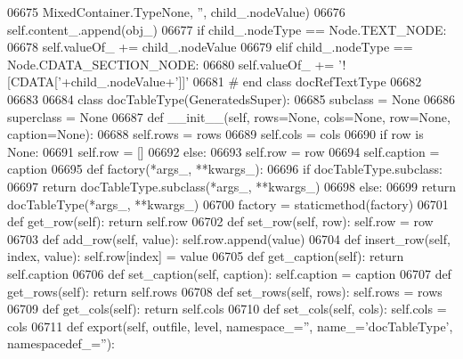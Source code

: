 \begin{DoxyCode}
{{{{{{{{{{{{{{{{{{{{{{{{{{{{{{{{{{{{{{{{{{{{{{{{{{{{{{{{{{{{{{{{{{{{{{{{{{{{{{{{{{{{{{{{{{{{{{{{{{{{{{{{{{{{{{{{{{{{{{{{{{{{{{{{{{{{{{{{{{{{{{{{{{{{{{{{{{{{{{{{{{{{{{{{{{{{{{{{{{{{{{{{{{{{{{{{{{{{{{{{{{{{{{{{{{{{{{{{{{{{{{{{{{{{{{{{{{{{{{{{{{{{{{{{{{{{{{{{{{{{{{{{{{{{{{{{{{{{{{{{{{{{{{{{{{{{{{{{{{{{{{{{{{{{{{{{{{{{{{{{{{{{{{{{{{{{{{{{{{{{{{{{{{{{{{{{{{{{{{{{{{{{{{{{{{{{{{{{{{{{{{{{{{{{{{{{{{{{{{{{{{{{{{{{{{{{{{06675                 MixedContainer.TypeNone, \textcolor{stringliteral}{''}, child\_.nodeValue)
06676             self.content\_.append(obj\_)
06677         \textcolor{keywordflow}{if} child\_.nodeType == Node.TEXT\_NODE:
06678             self.valueOf_ += child\_.nodeValue
06679         \textcolor{keywordflow}{elif} child\_.nodeType == Node.CDATA\_SECTION\_NODE:
06680             self.valueOf_ += \textcolor{stringliteral}{'![CDATA['}+child\_.nodeValue+\textcolor{stringliteral}{']]'}
06681 \textcolor{comment}{# end class docRefTextType}
06682 
06683 
06684 \textcolor{keyword}{class }docTableType(GeneratedsSuper):
06685     subclass = \textcolor{keywordtype}{None}
06686     superclass = \textcolor{keywordtype}{None}
06687     \textcolor{keyword}{def }__init__(self, rows=None, cols=None, row=None, caption=None):
06688         self.rows = rows
06689         self.cols = cols
06690         \textcolor{keywordflow}{if} row \textcolor{keywordflow}{is} \textcolor{keywordtype}{None}:
06691             self.row = []
06692         \textcolor{keywordflow}{else}:
06693             self.row = row
06694         self.caption = caption
06695     \textcolor{keyword}{def }factory(*args\_, **kwargs\_):
06696         \textcolor{keywordflow}{if} docTableType.subclass:
06697             \textcolor{keywordflow}{return} docTableType.subclass(*args\_, **kwargs\_)
06698         \textcolor{keywordflow}{else}:
06699             \textcolor{keywordflow}{return} docTableType(*args\_, **kwargs\_)
06700     factory = staticmethod(factory)
06701     \textcolor{keyword}{def }get_row(self): \textcolor{keywordflow}{return} self.row
06702     \textcolor{keyword}{def }set_row(self, row): self.row = row
06703     \textcolor{keyword}{def }add_row(self, value): self.row.append(value)
06704     \textcolor{keyword}{def }insert_row(self, index, value): self.row[index] = value
06705     \textcolor{keyword}{def }get_caption(self): \textcolor{keywordflow}{return} self.caption
06706     \textcolor{keyword}{def }set_caption(self, caption): self.caption = caption
06707     \textcolor{keyword}{def }get_rows(self): \textcolor{keywordflow}{return} self.rows
06708     \textcolor{keyword}{def }set_rows(self, rows): self.rows = rows
06709     \textcolor{keyword}{def }get_cols(self): \textcolor{keywordflow}{return} self.cols
06710     \textcolor{keyword}{def }set_cols(self, cols): self.cols = cols
06711     \textcolor{keyword}{def }export(self, outfile, level, namespace\_='', name\_='docTableType', namespacedef\_=''):
}}}}}}}}}}}}}}}}}}}}}}}}}}}}}}}}}}}}}}}}}}}}}}}}}}}}}}}}}}}}}}}}}}}}}}}}}}}}}}}}}}}}}}}}}}}}}}}}}}}}}}}}}}}}}}}}}}}}}}}}}}}}}}}}}}}}}}}}}}}}}}}}}}}}}}}}}}}}}}}}}}}}}}}}}}}}}}}}}}}}}}}}}}}}}}}}}}}}}}}}}}}}}}}}}}}}}}}}}}}}}}}}}}}}}}}}}}}}}}}}}}}}}}}}}}}}}}}}}}}}}}}}}}}}}}}}}}}}}}}}}}}}}}}}}}}}}}}}}}}}}}}}}}}}}}}}}}}}}}}}}}}}}}}}}}}}}}}}}}}}}}}}}}}}}}}}}}}}}}}}}}}}}}}}}}}}}}}}}}}}}}}}}}}}}}}}}}}}}}}}}}}}}}}}}}}}}}
\end{DoxyCode}
